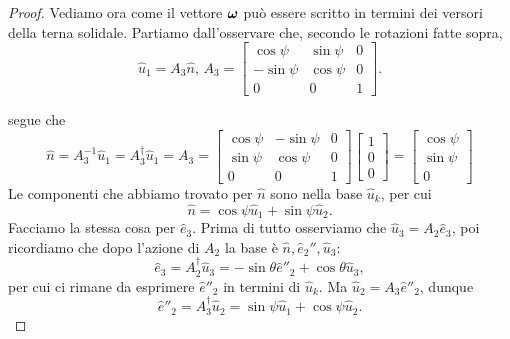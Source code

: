 \begin{proof}
        Vediamo ora come il vettore $\boldsymbol{\omega}$ può essere scritto in termini dei versori della terna solidale. Partiamo dall'osservare che, secondo le rotazioni fatte sopra, 
        \begin{equation}
            \hat{u}_1 = A_3\hat{n},\, A_3 = 
        \begin{bmatrix}
            \cos \psi & \sin \psi & 0\\
            -\sin \psi &\cos \psi & 0 \\
            0 & 0 & 1
        \end{bmatrix}.
        \end{equation}
    
    segue che
    \begin{equation}
        \hat{n} = A_3^{-1}\hat{u}_1 = A_3^\dagger \hat{u}_1 = A_3 = 
        \begin{bmatrix}
            \cos \psi & -\sin \psi & 0\\
            \sin \psi &\cos \psi & 0 \\
            0 & 0 & 1
        \end{bmatrix} \begin{bmatrix}
            1\\
            0\\
            0
        \end{bmatrix} = \begin{bmatrix}
            \cos \psi\\
            \sin \psi\\
            0
        \end{bmatrix}
    \end{equation}
    Le componenti che abbiamo trovato per $\hat{n}$ sono nella base $\hat{u}_k$, per cui
    \begin{equation}
        \hat{n} = \cos \psi \hat{u}_1 +\sin\psi \hat{u}_2.
    \end{equation}
    Facciamo la stessa cosa per $\hat{e}_3$. Prima di tutto osserviamo che $\hat{u}_3 = A_2\hat{e}_3$, poi ricordiamo che dopo l'azione di $A_2$ la base è $\hat{n},\hat{e}_2'',\hat{u}_3$:
    \begin{equation}
        \hat{e}_3 = A_2^\dagger\hat{u}_3 = -\sin\theta \hat{e}''_2+\cos\theta \hat{u}_3,
    \end{equation}
    per cui ci rimane da esprimere $\hat{e}''_2$ in termini di $\hat{u}_k$. Ma $\hat{u}_2=A_3\hat{e}''_2$, dunque
    \begin{equation}
        \hat{e}''_2 = A_3^\dagger \hat{u}_2 = \sin\psi \hat{u}_1+\cos\psi\hat{u}_2.

\end{equation}
\end{proof}
